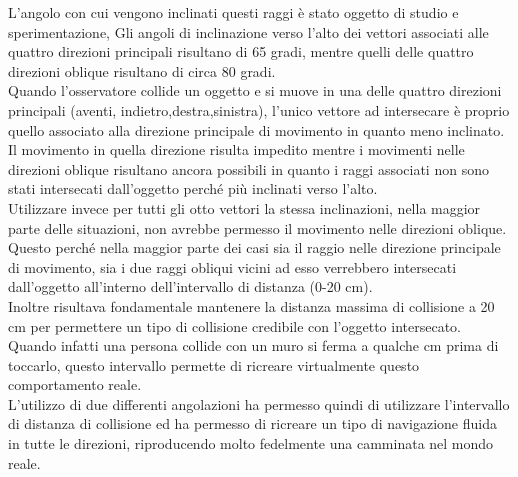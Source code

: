 L’angolo con cui vengono inclinati questi raggi è stato oggetto di studio e sperimentazione, 
Gli angoli di inclinazione verso l’alto dei vettori associati alle quattro direzioni principali risultano di 65 gradi, mentre quelli delle quattro direzioni oblique risultano di circa 80 gradi.
\\
Quando l’osservatore collide un oggetto e si muove in una delle quattro direzioni principali (aventi, indietro,destra,sinistra), l’unico vettore ad intersecare è proprio quello associato alla direzione principale di movimento in quanto meno inclinato.
\\
Il movimento in quella direzione risulta impedito mentre i movimenti nelle direzioni oblique risultano ancora possibili in quanto i raggi associati non sono stati intersecati dall’oggetto perché più inclinati verso l’alto.
\\
Utilizzare invece per tutti gli otto vettori la stessa inclinazioni, nella maggior parte delle situazioni, non avrebbe permesso il movimento nelle direzioni oblique. 
Questo perché nella maggior parte dei casi sia il raggio nelle direzione principale di movimento, sia i due raggi obliqui vicini ad esso verrebbero intersecati dall’oggetto all’interno dell’intervallo di distanza (0-20 cm).
\\
Inoltre risultava fondamentale mantenere la distanza massima di collisione a 20 cm per permettere un tipo di collisione credibile con l’oggetto intersecato. Quando infatti una persona collide con un muro si ferma a qualche cm prima di toccarlo, questo intervallo permette di ricreare virtualmente questo comportamento reale.
\\
L’utilizzo di due differenti angolazioni ha permesso quindi di utilizzare l’intervallo di distanza di collisione ed ha permesso di ricreare un tipo di navigazione fluida in tutte le direzioni, riproducendo molto fedelmente una camminata nel mondo reale.
\\

